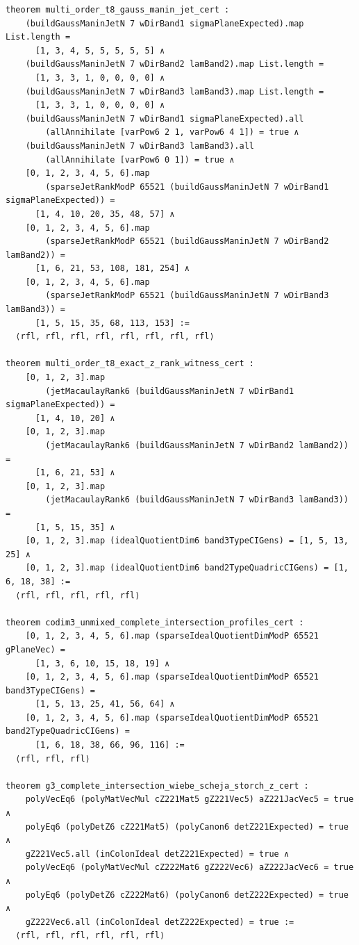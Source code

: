 \documentclass[11pt,a4paper]{article}
\begin{document}
\begin{lstlisting}[caption={Order-8 Gauss--Manin jet, exact $\mathbb{Z}$-rank, and CI quotient theorems in \texttt{HigherOrderJetLifting.lean}.}]
theorem multi_order_t8_gauss_manin_jet_cert :
    (buildGaussManinJetN 7 wDirBand1 sigmaPlaneExpected).map List.length =
      [1, 3, 4, 5, 5, 5, 5, 5] ∧
    (buildGaussManinJetN 7 wDirBand2 lamBand2).map List.length =
      [1, 3, 3, 1, 0, 0, 0, 0] ∧
    (buildGaussManinJetN 7 wDirBand3 lamBand3).map List.length =
      [1, 3, 3, 1, 0, 0, 0, 0] ∧
    (buildGaussManinJetN 7 wDirBand1 sigmaPlaneExpected).all
        (allAnnihilate [varPow6 2 1, varPow6 4 1]) = true ∧
    (buildGaussManinJetN 7 wDirBand3 lamBand3).all
        (allAnnihilate [varPow6 0 1]) = true ∧
    [0, 1, 2, 3, 4, 5, 6].map
        (sparseJetRankModP 65521 (buildGaussManinJetN 7 wDirBand1 sigmaPlaneExpected)) =
      [1, 4, 10, 20, 35, 48, 57] ∧
    [0, 1, 2, 3, 4, 5, 6].map
        (sparseJetRankModP 65521 (buildGaussManinJetN 7 wDirBand2 lamBand2)) =
      [1, 6, 21, 53, 108, 181, 254] ∧
    [0, 1, 2, 3, 4, 5, 6].map
        (sparseJetRankModP 65521 (buildGaussManinJetN 7 wDirBand3 lamBand3)) =
      [1, 5, 15, 35, 68, 113, 153] :=
  ⟨rfl, rfl, rfl, rfl, rfl, rfl, rfl, rfl⟩

theorem multi_order_t8_exact_z_rank_witness_cert :
    [0, 1, 2, 3].map
        (jetMacaulayRank6 (buildGaussManinJetN 7 wDirBand1 sigmaPlaneExpected)) =
      [1, 4, 10, 20] ∧
    [0, 1, 2, 3].map
        (jetMacaulayRank6 (buildGaussManinJetN 7 wDirBand2 lamBand2)) =
      [1, 6, 21, 53] ∧
    [0, 1, 2, 3].map
        (jetMacaulayRank6 (buildGaussManinJetN 7 wDirBand3 lamBand3)) =
      [1, 5, 15, 35] ∧
    [0, 1, 2, 3].map (idealQuotientDim6 band3TypeCIGens) = [1, 5, 13, 25] ∧
    [0, 1, 2, 3].map (idealQuotientDim6 band2TypeQuadricCIGens) = [1, 6, 18, 38] :=
  ⟨rfl, rfl, rfl, rfl, rfl⟩

theorem codim3_unmixed_complete_intersection_profiles_cert :
    [0, 1, 2, 3, 4, 5, 6].map (sparseIdealQuotientDimModP 65521 gPlaneVec) =
      [1, 3, 6, 10, 15, 18, 19] ∧
    [0, 1, 2, 3, 4, 5, 6].map (sparseIdealQuotientDimModP 65521 band3TypeCIGens) =
      [1, 5, 13, 25, 41, 56, 64] ∧
    [0, 1, 2, 3, 4, 5, 6].map (sparseIdealQuotientDimModP 65521 band2TypeQuadricCIGens) =
      [1, 6, 18, 38, 66, 96, 116] :=
  ⟨rfl, rfl, rfl⟩

theorem g3_complete_intersection_wiebe_scheja_storch_z_cert :
    polyVecEq6 (polyMatVecMul cZ221Mat5 gZ221Vec5) aZ221JacVec5 = true ∧
    polyEq6 (polyDetZ6 cZ221Mat5) (polyCanon6 detZ221Expected) = true ∧
    gZ221Vec5.all (inColonIdeal detZ221Expected) = true ∧
    polyVecEq6 (polyMatVecMul cZ222Mat6 gZ222Vec6) aZ222JacVec6 = true ∧
    polyEq6 (polyDetZ6 cZ222Mat6) (polyCanon6 detZ222Expected) = true ∧
    gZ222Vec6.all (inColonIdeal detZ222Expected) = true :=
  ⟨rfl, rfl, rfl, rfl, rfl, rfl⟩
\end{lstlisting}
\end{document}
